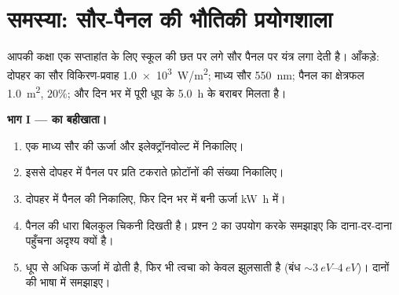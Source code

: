 \section{समस्या: सौर-पैनल की भौतिकी प्रयोगशाला}

\begin{problem}
\label{pb:g12:quantum-world:1}
आपकी कक्षा एक सप्ताहांत के लिए स्कूल की छत पर लगे सौर पैनल पर यंत्र लगा देती
है। आँकड़े: दोपहर का सौर विकिरण-प्रवाह \qty{1.0e3}{W/m^2}; माध्य सौर 
\qty{550}{nm}; पैनल का क्षेत्रफल \qty{1.0}{m^2},  $20\%$; और दिन भर में
पूरी धूप के \qty{5.0}{h} के बराबर मिलता है।

\medskip
\noindent\textbf{भाग I ---  का बहीखाता।}
\begin{enumerate}
  \item एक माध्य सौर  की ऊर्जा  और
        इलेक्ट्रॉनवोल्ट में निकालिए।
  \item इससे दोपहर में पैनल पर प्रति  टकराते फ़ोटॉनों की संख्या
        निकालिए।
  \item दोपहर में पैनल की  निकालिए, फिर दिन भर में बनी
        ऊर्जा \unit{kW.h} में।
  \item पैनल की धारा बिलकुल चिकनी दिखती है। प्रश्न 2 का उपयोग करके समझाइए कि
        दाना-दर-दाना पहुँचना अदृश्य क्यों है।
  \item धूप  से अधिक ऊर्जा  में ढोती
        है, फिर भी त्वचा को केवल  झुलसाती है (बंध $\sim \qtyrange{3}{4}{eV}$)।
        दानों की भाषा में समझाइए।
\end{enumerate}


\end{problem}
